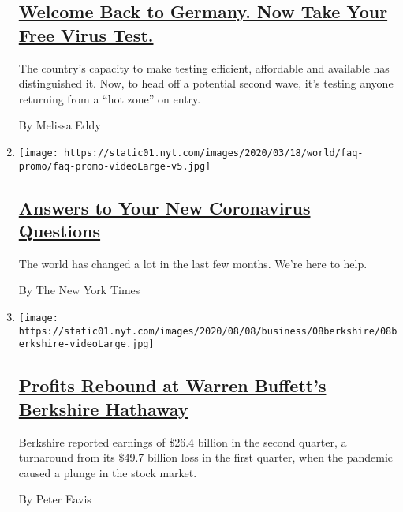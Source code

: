 \begin{enumerate}
  \hypertarget{welcome-back-to-germany-now-take-your-free-virus-test}{%
  \subsection{\texorpdfstring{\href{/2020/08/05/world/europe/germany-coronavirus-test-travelers.html}{Welcome
  Back to Germany. Now Take Your Free Virus
  Test.}}{Welcome Back to Germany. Now Take Your Free Virus Test.}}\label{welcome-back-to-germany-now-take-your-free-virus-test}}

  The country's capacity to make testing efficient, affordable and
  available has distinguished it. Now, to head off a potential second
  wave, it's testing anyone returning from a ``hot zone'' on entry.

  By Melissa Eddy
\item
  \texttt{[image: https://static01.nyt.com/images/2020/03/18/world/faq-promo/faq-promo-videoLarge-v5.jpg]}

  \hypertarget{answers-to-your-new-coronavirus-questions}{%
  \subsection{\texorpdfstring{\href{/interactive/2020/world/coronavirus-tips-advice.html}{Answers
  to Your New Coronavirus
  Questions}}{Answers to Your New Coronavirus Questions}}\label{answers-to-your-new-coronavirus-questions}}

  The world has changed a lot in the last few months. We're here to
  help.

  By The New York Times
\item
  \texttt{[image: https://static01.nyt.com/images/2020/08/08/business/08berkshire/08berkshire-videoLarge.jpg]}

  \hypertarget{profits-rebound-at-warren-buffetts-berkshire-hathaway}{%
  \subsection{\texorpdfstring{\href{/2020/08/08/business/berkshire-hathaway-earnings-warren-buffett.html}{Profits
  Rebound at Warren Buffett's Berkshire
  Hathaway}}{Profits Rebound at Warren Buffett's Berkshire Hathaway}}\label{profits-rebound-at-warren-buffetts-berkshire-hathaway}}

  Berkshire reported earnings of \$26.4 billion in the second quarter, a
  turnaround from its \$49.7 billion loss in the first quarter, when the
  pandemic caused a plunge in the stock market.

  By Peter Eavis
\end{enumerate}

